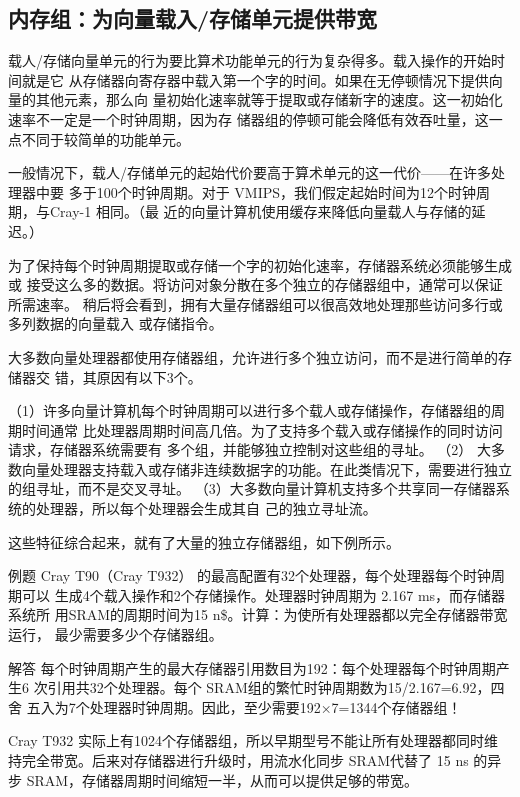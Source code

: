\subsection{内存组：为向量载入/存储单元提供带宽}

载人/存储向量单元的行为要比算术功能单元的行为复杂得多。载入操作的开始时间就是它
从存储器向寄存器中载入第一个字的时间。如果在无停顿情况下提供向量的其他元素，那么向
量初始化速率就等于提取或存储新字的速度。这一初始化速率不一定是一个时钟周期，因为存
储器组的停顿可能会降低有效吞吐量，这一点不同于较简单的功能单元。

一般情况下，载人/存储单元的起始代价要高于算术单元的这一代价——在许多处理器中要
多于100个时钟周期。对于 VMIPS，我们假定起始时间为12个时钟周期，与Cray-1 相同。（最
近的向量计算机使用缓存来降低向量载人与存储的延迟。）

为了保持每个时钟周期提取或存储一个字的初始化速率，存储器系统必须能够生成或
接受这么多的数据。将访问对象分散在多个独立的存储器组中，通常可以保证所需速率。
稍后将会看到，拥有大量存储器组可以很高效地处理那些访问多行或多列数据的向量载入
或存储指令。

大多数向量处理器都使用存储器组，允许进行多个独立访问，而不是进行简单的存储器交
错，其原因有以下3个。

（1）许多向量计算机每个时钟周期可以进行多个载人或存储操作，存储器组的周期时间通常
比处理器周期时间高几倍。为了支持多个载入或存储操作的同时访问请求，存储器系统需要有
多个组，并能够独立控制对这些组的寻址。
（2） 大多数向量处理器支持载入或存储非连续数据字的功能。在此类情况下，需要进行独立
的组寻址，而不是交叉寻址。
（3）大多数向量计算机支持多个共享同一存储器系统的处理器，所以每个处理器会生成其自
己的独立寻址流。

这些特征综合起来，就有了大量的独立存储器组，如下例所示。

例题
Cray T90（Cray T932） 的最高配置有32个处理器，每个处理器每个时钟周期可以
生成4个载入操作和2个存储操作。处理器时钟周期为 2.167 ms，而存储器系统所
用SRAM的周期时间为15 n\$。计算：为使所有处理器都以完全存储器带宽运行，
最少需要多少个存储器组。

解答
每个时钟周期产生的最大存储器引用数目为192：每个处理器每个时钟周期产生6
次引用共32个处理器。每个 SRAM组的繁忙时钟周期数为15/2.167=6.92，四舍
五入为7个处理器时钟周期。因此，至少需要192×7=1344个存储器组！

Cray T932 实际上有1024个存储器组，所以早期型号不能让所有处理器都同时维
持完全带宽。后来对存储器进行升级时，用流水化同步 SRAM代替了 15 ns 的异
步 SRAM，存储器周期时间缩短一半，从而可以提供足够的带宽。

